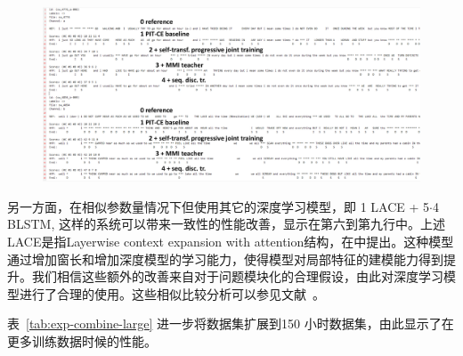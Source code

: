 \begin{figure}[!htp]
  \centering
    \captionstyle{\centering}
    \includegraphics[width=\textwidth]{figure/pit-example.pdf}
\end{figure}


另一方面，在相似参数量情况下但使用其它的深度学习模型，即 {1 LACE + 5$\cdot$4 BLSTM}, 这样的系统可以带来一致性的性能改善，显示在第六到第九行中。上述LACE是指Layerwise context expansion with attention结构，在\cite{LACE-yu2016}中提出。这种模型通过增加窗长和增加深度模型的学习能力，使得模型对局部特征的建模能力得到提升。我们相信这些额外的改善来自对于问题模块化的合理假设，由此对深度学习模型进行了合理的使用。这些相似比较分析可以参见文献~\cite{chen2018progressive}。



表~\ref{tab:exp-combine-large} 进一步将数据集扩展到150 小时数据集，由此显示了在更多训练数据时候的性能。

